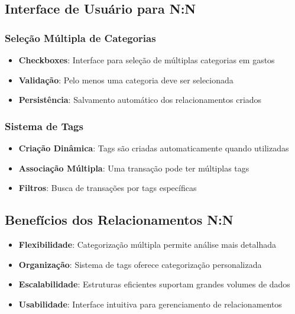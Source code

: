 \documentclass[12pt,a4paper]{article}
\begin{document}
\subsection{Interface de Usuário para N:N}

\subsubsection*{Seleção Múltipla de Categorias}
\begin{itemize}
  \item \textbf{Checkboxes}: Interface para seleção de múltiplas categorias em gastos
  \item \textbf{Validação}: Pelo menos uma categoria deve ser selecionada
  \item \textbf{Persistência}: Salvamento automático dos relacionamentos criados
\end{itemize}

\subsubsection*{Sistema de Tags}
\begin{itemize}
  \item \textbf{Criação Dinâmica}: Tags são criadas automaticamente quando utilizadas
  \item \textbf{Associação Múltipla}: Uma transação pode ter múltiplas tags
  \item \textbf{Filtros}: Busca de transações por tags específicas
\end{itemize}

\subsection{Benefícios dos Relacionamentos N:N}

\begin{itemize}
  \item \textbf{Flexibilidade}: Categorização múltipla permite análise mais detalhada
  \item \textbf{Organização}: Sistema de tags oferece categorização personalizada
  \item \textbf{Escalabilidade}: Estruturas eficientes suportam grandes volumes de dados
  \item \textbf{Usabilidade}: Interface intuitiva para gerenciamento de relacionamentos
\end{itemize}
\end{document}
